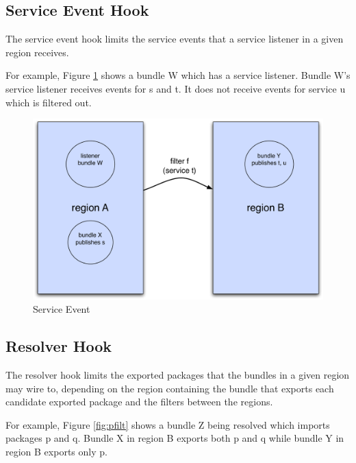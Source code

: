 \documentclass[a4paper,9pt,twoside]{article}
\begin{document}
\subsection{Service Event Hook}

The service event hook limits the service events that a service listener in a given region receives.

For example, Figure \ref{fig:sevent} shows a bundle W which has a service listener.
Bundle W's service listener receives events for s and t. It does not receive events for service u which is filtered out. 
\begin{figure}[h!]
\begin{center}
\includegraphics*[scale=0.4]{service-event.pdf}
\caption{Service Event \label{fig:sevent}}
\end{center}
\end{figure}

\subsection{Resolver Hook}

The resolver hook limits the exported packages that the bundles in a given region may wire to, depending on
the region containing the bundle that exports each candidate exported package and the filters between the
regions.

For example, Figure \ref{fig:pfilt} shows a bundle Z being resolved which imports packages p and q. Bundle X
in region B exports both p and q while bundle Y in region B exports only p.
\end{document}
